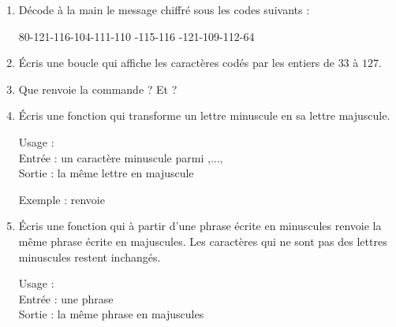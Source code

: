 \documentclass[11pt,class=report,crop=false]{standalone}
\begin{document}

\begin{activite}



\begin{enumerate}
  \item Décode à la main le message chiffré sous les codes suivants : \\
  
\centerline{80-121-116-104-111-110 -115-116 -121-109-112-64}
   
    
  \item  Écris une boucle qui affiche les caractères codés par les entiers de $33$ à $127$.
  
  \item Que renvoie la commande  ? Et  ?
  
  \item Écris une fonction  qui transforme un lettre minuscule en sa lettre majuscule.
  
  \begin{fonction}
  
   Usage : \\
   Entrée : un caractère minuscule parmi ,...,\\
   Sortie : la même lettre en majuscule
  
  \medskip
     
   Exemple :  renvoie 
  \end{fonction} 
  
    \item Écris une fonction  qui à partir d'une phrase écrite en minuscules renvoie la même phrase écrite en majuscules. Les caractères qui ne sont pas des lettres minuscules restent inchangés.
  
  \begin{fonction}[\ci{majuscules()}]
   Usage : \\
   Entrée : une phrase\\
   Sortie : la même phrase en majuscules
  

\end{fonction}
\end{enumerate}
\end{activite}
\end{document}
